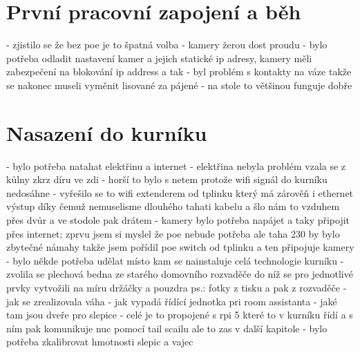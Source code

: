 \newpage
\section{První pracovní zapojení a běh}\label{sec:prvni-pracovni-zapojeni-a-beh}
- zjistilo se že bez poe je to špatná volba \newline
- kamery žerou dost proudu\newline
- bylo potřeba odladit nastavení kamer a jejich statické ip adresy, kamery měli zabezpečení na blokování ip address a tak\newline
- byl problém s kontakty na váze takže se nakonec museli vyměnit lisované za pájené\newline
- na stole to většinou funguje dobře \newline

\newpage
\section{Nasazení do kurníku}\label{sec:nasazeni-do-kurniku}
- bylo potřeba natahat elektřinu a internet \newline
- elektřina nebyla problém vzala se z kůlny zkrz díru ve zdi\newline
- horší to bylo s netem protože wifi signál do kurníku nedosáhne\newline
- vyřešilo se to wifi extenderem od tplinku který má zárověň i ethernet výstup díky čemuž nemuselisme dlouhého tahati kabelu a šlo nám to vzduhem přes dvůr a ve stodole pak drátem\newline
- kamery bylo potřeba napájet a taky připojit přes internet; zprvu jsem si myslel že poe nebude potřeba ale taha 230 by bylo zbytečné námahy takže jsem pořídil poe switch od tplinku a ten připojuje kamery\newline
- bylo někde potřeba udělat místo kam se nainstaluje celá technologie kurníku\newline
- zvolila se plechová bedna ze starého domovního rozvaděče do níž se pro jednotlivé prvky vytvožili na míru držáčky a pouzdra ps.: fotky z tisku a pak z rozvaděče\newline
- jak se zrealizovala váha\newline
- jak vypadá řídící jednotka pri room assistanta\newline
- jaké tam jsou dveře pro slepice\newline
- celé je to propojené s rpi 5 které to v kurníku řídí a s ním pak komunikuje nuc pomocí tail scailu ale to zas v další kapitole\newline
- bylo potřeba zkalibrovat hmotnosti slepic a vajec

